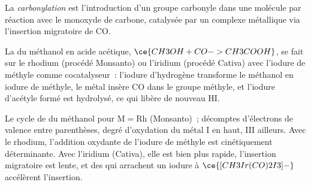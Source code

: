 \begin{definition}[Carbonylation]\label{def:b3:homogeneous-catalysis:carbonylation}
La \emph{carbonylation} est l'introduction d'un groupe
carbonyle dans une molécule par réaction avec le monoxyde de carbone,
catalysée par un complexe métallique via l'insertion migratoire de CO.
\end{definition}

La  du méthanol en acide acétique, $\ce{CH3OH + CO -> CH3COOH}$, se fait sur
le rhodium (procédé Monsanto) ou l'iridium (procédé Cativa) avec l'iodure
de méthyle comme cocatalyseur~: l'iodure d'hydrogène transforme le méthanol
en iodure de méthyle, le métal insère CO dans le groupe méthyle, et
l'iodure d'acétyle formé est hydrolysé, ce qui libère de nouveau HI.

\begin{omfigure}

{\small Le cycle de  du méthanol pour $\mathrm M = \mathrm{Rh}$ (Monsanto)~; décomptes
d'électrons de valence entre parenthèses, degré d'oxydation du métal I en
haut, III ailleurs. Avec le rhodium, l'addition oxydante de l'iodure de
méthyle est cinétiquement déterminante. Avec l'iridium (Cativa), elle est
bien plus rapide, l'insertion migratoire est lente, et des  qui
arrachent un iodure à $\ce{[CH3Ir(CO)2I3]-}$ accélèrent l'insertion.}
\end{omfigure}

